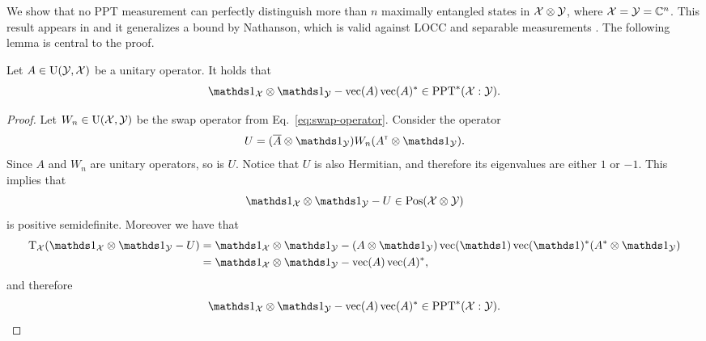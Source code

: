 We show that no PPT measurement can perfectly distinguish more than $n$ 
maximally entangled states in $\mathcal{X}\otimes\mathcal{Y}$, where $\mathcal{X} = \mathcal{Y} = \mathbb{C}^{n}$. 
This result appears in \cite{Yu12} and it generalizes 
a bound by Nathanson, which is valid against LOCC and separable measurements 
\cite{Nathanson05}. The following lemma is central to the proof.
\begin{lemma}
  \label{lemma:isometry-ppt-star}
  Let $A\in\mathrm{U}(\mathcal{Y},\mathcal{X})$ be a unitary operator.
  It holds that
  \begin{equation}
  \label{eq:reduction-operator}
    \I_{\X}\otimes\I_{\Y} - \vec(A) \vec(A)^{\ast} \in \PPTStar(\X:\Y).
  \end{equation}
\end{lemma}
\begin{proof}
Let $W_{n}\in\mathrm{U}(\mathcal{X},\mathcal{Y})$ be the swap operator from Eq.~\eqref{eq:swap-operator}.
Consider the operator 
\begin{equation}
  U = (\overline{A}\otimes\I_{\Y})W_{n}(A^{\t}\otimes\I_{\Y}).
\end{equation}
Since $A$ and $W_{n}$ are unitary operators, so is $U$. Notice that $U$ is also Hermitian, 
and therefore its eigenvalues are either $1$ or $-1$. This implies that
\begin{equation}
  \I_{\X}\otimes\I_{\Y} -  U \in \Pos(\X\otimes\Y)
\end{equation}
is positive semidefinite. Moreover we have that
\begin{equation}
  \begin{aligned}
    \pt_{\X}(\I_{\X}\otimes\I_{\Y} -  U) &= \I_{\X}\otimes\I_{\Y} - 
      (A\otimes\I_{\Y})\vec(\I)\vec(\I)^{\ast}(A^{\ast}\otimes\I_{\Y}) \\ 
      &= \I_{\X}\otimes\I_{\Y} - \vec(A) \vec(A)^{\ast},
  \end{aligned} 
\end{equation}
and therefore 
  \begin{equation}
    \I_{\X}\otimes\I_{\Y} - \vec(A) \vec(A)^{\ast} \in \PPTStar(\X:\Y).
  \end{equation}
\end{proof}

